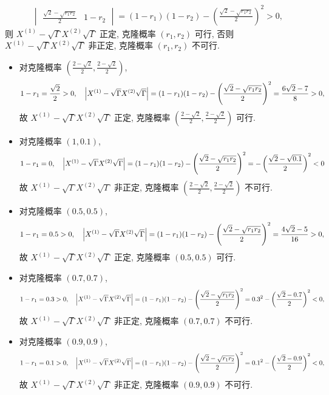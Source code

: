 \documentclass{assignment}
\begin{document}
\begin{sol}
\begin{itemize}
\begin{align}
\begin{vmatrix}
                \frac{\sqrt{2}-\sqrt{r_1r_2}}{2}&1-r_2
            \end{vmatrix}=(1-r_1)(1-r_2)-\left(\frac{\sqrt{2}-\sqrt{r_1r_2}}{2}\right)^2>0,
        \end{align}
        则 $X^{(1)}-\sqrt{\Gamma}X^{(2)}\sqrt{\Gamma}$ 正定, 克隆概率 $(r_1,r_2)$ 可行, 否则 $X^{(1)}-\sqrt{\Gamma}X^{(2)}\sqrt{\Gamma}$ 非正定, 克隆概率 $(r_1,r_2)$ 不可行.
        \begin{itemize}
            \item 对克隆概率 $\left(\frac{2-\sqrt{2}}{2},\frac{2-\sqrt{2}}{2}\right)$,
            \[
                1-r_1=\frac{\sqrt{2}}{2}>0,\quad\left\lvert X^{(1)}-\sqrt{\Gamma}X^{(2)}\sqrt{\Gamma}\right\rvert=(1-r_1)(1-r_2)-\left(\frac{\sqrt{2}-\sqrt{r_1r_2}}{2}\right)^2=\frac{6\sqrt{2}-7}{8}>0,
            \]
            故 $X^{(1)}-\sqrt{\Gamma}X^{(2)}\sqrt{\Gamma}$ 正定, 克隆概率 $\left(\frac{2-\sqrt{2}}{2},\frac{2-\sqrt{2}}{2}\right)$ 可行.
            \item 对克隆概率 $(1,0.1)$,
            \[
                1-r_1=0,\quad\left\lvert X^{(1)}-\sqrt{\Gamma}X^{(2)}\sqrt{\Gamma}\right\rvert=(1-r_1)(1-r_2)-\left(\frac{\sqrt{2}-\sqrt{r_1r_2}}{2}\right)^2=-\left(\frac{\sqrt{2}-\sqrt{0.1}}{2}\right)^2<0
            \]
            故 $X^{(1)}-\sqrt{\Gamma}X^{(2)}\sqrt{\Gamma}$ 非正定, 克隆概率 $\left(\frac{2-\sqrt{2}}{2},\frac{2-\sqrt{2}}{2}\right)$ 不可行.
            \item 对克隆概率 $(0.5,0.5)$,
            \[
                1-r_1=0.5>0,\quad\left\lvert X^{(1)}-\sqrt{\Gamma}X^{(2)}\sqrt{\Gamma}\right\rvert=(1-r_1)(1-r_2)-\left(\frac{\sqrt{2}-\sqrt{r_1r_2}}{2}\right)^2=\frac{4\sqrt{2}-5}{16}>0,
            \]
            故 $X^{(1)}-\sqrt{\Gamma}X^{(2)}\sqrt{\Gamma}$ 正定, 克隆概率 $(0.5,0.5)$ 可行.
            \item 对克隆概率 $(0.7,0.7)$,
            \[
                1-r_1=0.3>0,\quad\left\lvert X^{(1)}-\sqrt{\Gamma}X^{(2)}\sqrt{\Gamma}\right\rvert=(1-r_1)(1-r_2)-\left(\frac{\sqrt{2}-\sqrt{r_1r_2}}{2}\right)^2=0.3^2-\left(\frac{\sqrt{2}-0.7}{2}\right)^2<0,
            \]
            故 $X^{(1)}-\sqrt{\Gamma}X^{(2)}\sqrt{\Gamma}$ 非正定, 克隆概率 $(0.7,0.7)$ 不可行.
            \item 对克隆概率 $(0.9,0.9)$,
            \[
                1-r_1=0.1>0,\quad\left\lvert X^{(1)}-\sqrt{\Gamma}X^{(2)}\sqrt{\Gamma}\right\rvert=(1-r_1)(1-r_2)-\left(\frac{\sqrt{2}-\sqrt{r_1r_2}}{2}\right)^2=0.1^2-\left(\frac{\sqrt{2}-0.9}{2}\right)^2<0,
            \]
            故 $X^{(1)}-\sqrt{\Gamma}X^{(2)}\sqrt{\Gamma}$ 非正定, 克隆概率 $(0.9,0.9)$ 不可行.
        \end{itemize}

\end{itemize}
\end{sol}
\end{document}
